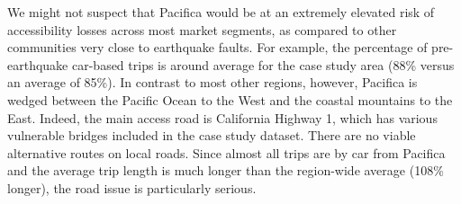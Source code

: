 

We might not suspect that Pacifica would be at an extremely elevated risk of accessibility losses across most market segments, as compared to other communities very close to earthquake faults. For example, the percentage of pre-earthquake car-based trips is around average for the case study area (88\% versus an average of 85\%). 
In contrast to most other regions, however, Pacifica is wedged between the Pacific Ocean to the West and the coastal mountains to the East. Indeed, the main access road is California Highway 1, which has various vulnerable bridges included in the case study dataset. There are no viable alternative routes on local roads. Since almost all trips are by car from Pacifica and the average trip length is much longer than the region-wide average (108\% longer), the road issue is particularly serious.

